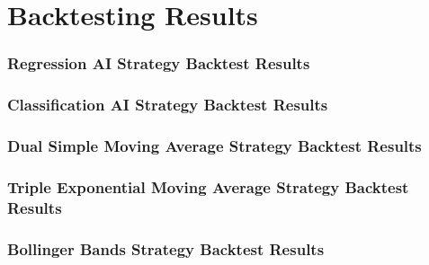 \section{Backtesting Results}
\label{chap:backtest-results}

\subsubsection{Regression AI Strategy Backtest Results}

\subsubsection{Classification AI Strategy Backtest Results}

\subsubsection{Dual Simple Moving Average Strategy Backtest Results}

\subsubsection{Triple Exponential Moving Average Strategy Backtest Results}

\subsubsection{Bollinger Bands Strategy Backtest Results}